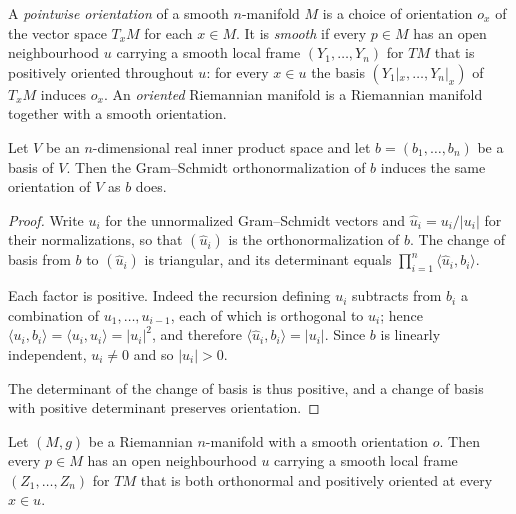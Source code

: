 \begin{definition}
\label{def:smooth-orientation}
\leanok
A \emph{pointwise orientation} of a smooth $n$-manifold $M$ is a choice of orientation $o_x$ of
the vector space $T_x M$ for each $x \in M$. It is \emph{smooth} if every $p \in M$ has an open
neighbourhood $u$ carrying a smooth local frame $(Y_1, \ldots, Y_n)$ for $TM$ that is
positively oriented throughout $u$: for every $x \in u$ the basis $(Y_1|_x, \ldots, Y_n|_x)$ of
$T_x M$ induces $o_x$. An \emph{oriented} Riemannian manifold is a Riemannian manifold together
with a smooth orientation.
\end{definition}

\begin{lemma}
\label{lem:gram-schmidt-preserves-orientation}
\leanok
Let $V$ be an $n$-dimensional real inner product space and let $b = (b_1, \ldots, b_n)$ be a
basis of $V$. Then the Gram--Schmidt orthonormalization of $b$ induces the same orientation of
$V$ as $b$ does.
\end{lemma}

\begin{proof}
\leanok
Write $u_i$ for the unnormalized Gram--Schmidt vectors and $\hat u_i = u_i / |u_i|$ for their
normalizations, so that $(\hat u_i)$ is the orthonormalization of $b$. The change of basis from
$b$ to $(\hat u_i)$ is triangular, and its determinant equals
$\prod_{i=1}^{n} \langle \hat u_i, b_i \rangle$.

Each factor is positive. Indeed the recursion defining $u_i$ subtracts from $b_i$ a combination
of $u_1, \ldots, u_{i-1}$, each of which is orthogonal to $u_i$; hence
$\langle u_i, b_i \rangle = \langle u_i, u_i \rangle = |u_i|^2$, and therefore
$\langle \hat u_i, b_i \rangle = |u_i|$. Since $b$ is linearly independent, $u_i \ne 0$ and so
$|u_i| > 0$.

The determinant of the change of basis is thus positive, and a change of basis with positive
determinant preserves orientation.
\end{proof}

\begin{proposition}
\label{prop:oriented-orthonormal-frames}
\leanok
{}
Let $(M,g)$ be a Riemannian $n$-manifold with a smooth orientation $o$. Then every $p \in M$ has
an open neighbourhood $u$ carrying a smooth local frame $(Z_1, \ldots, Z_n)$ for $TM$ that is
both orthonormal and positively oriented at every $x \in u$.
\end{proposition}

